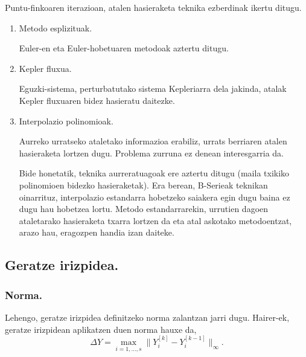 Puntu-finkoaren iterazioan, atalen hasieraketa teknika ezberdinak ikertu ditugu. 
\begin{enumerate}
\item Metodo esplizituak.

Euler-en eta Euler-hobetuaren metodoak aztertu ditugu.

\item Kepler fluxua.

Eguzki-sistema, perturbatutako sistema Kepleriarra dela jakinda, atalak Kepler fluxuaren bidez hasieratu daitezke.

\item Interpolazio polinomioak.

Aurreko urratseko ataletako informazioa erabiliz, urrats berriaren atalen hasieraketa lortzen dugu. Problema zurruna ez denean interesgarria da. 

Bide honetatik, teknika aurreratuagoak ere aztertu ditugu (maila txikiko polinomioen bidezko hasieraketak). Era berean, B-Serieak \cite{Chartier2010} teknikan oinarrituz, interpolazio estandarra \cite{Laburta1998} hobetzeko saiakera egin dugu baina ez dugu hau hobetzea lortu. Metodo estandarrarekin, urrutien dagoen ataletarako hasieraketa txarra lortzen da eta atal askotako metodoentzat, arazo hau, eragozpen handia izan daiteke.  

\end{enumerate}

\subsection*{Geratze irizpidea.}


\subsubsection*{Norma.}
Lehengo, geratze irizpidea definitzeko norma zalantzan jarri dugu. Hairer-ek, geratze irizpidean aplikatzen duen norma hauxe da,
\begin{equation*}
\Delta Y= \max_{i=1,\dots,s} \|Y_i^{[k]}-Y_i^{[k-1]}\|_{\infty}.
\end{equation*}

